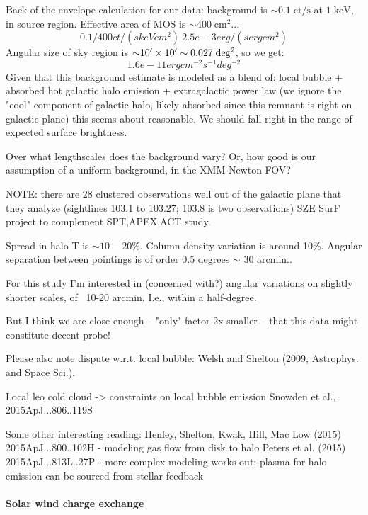 \documentclass[twocolumn,tighten,trackchanges]{aastex6}
\newcommand*{\mt}{\mathrm}
\newcommand*{\unit}[1]{\;\mt{#1}}  %
\newcommand*{\abt}{\mathord{\sim}} %
\begin{document}
Back of the envelope calculation for our data:
background is $\abt0.1 \unit{ct/s}$ at $1 \unit{keV}$, in source region.
Effective area of MOS is $\abt400 \unit{cm^2}$...
\[
    0.1/400 ct/(s keV cm^2) ~ 2.5e-3 erg / (s erg cm^2)
\]
Angular size of sky region is $\abt 10\arcmin \times 10\arcmin \sim 0.027 \unit{deg^2}$, so we get:
\[
    1.6e-11 erg cm^{-2} s^{-1} deg^{-2}
\]
Given that this background estimate is modeled as a blend of:
local bubble + absorbed hot galactic halo emission + extragalactic power law
(we ignore the "cool" component of galactic halo, likely absorbed since
this remnant is right on galactic plane)
this seems about reasonable.  We should fall right in the range of expected
surface brightness.


Over what lengthscales does the background vary?  Or, how good is our
assumption of a uniform background, in the XMM-Newton FOV?

NOTE: there are 28 clustered observations well out of the galactic plane
that they analyze (sightlines 103.1 to 103.27; 103.8 is two observations)
SZE SurF project to complement SPT,APEX,ACT study.

    Spread in halo T is $\abt10-20\%$.  Column density variation is around 10\%.
    Angular separation between pointings is of order 0.5 degrees $\sim$ 30 arcmin..

    For this study I'm interested in (concerned with?)
    angular variations on slightly shorter scales, of ~10-20 arcmin.  I.e.,
    within a half-degree.

    But I think we are close enough -- "only" factor 2x smaller -- that this
    data might constitute decent probe!



Please also note dispute w.r.t. local bubble: Welsh and Shelton (2009,
Astrophys. and Space Sci.).

Local leo cold cloud -> constraints on local bubble emission
Snowden et al., 2015ApJ...806..119S

Some other interesting reading:
Henley, Shelton, Kwak, Hill, Mac Low (2015) 2015ApJ...800..102H
- modeling gas flow from disk to halo
Peters et al. (2015) 2015ApJ...813L..27P
- more complex modeling works out; plasma for halo emission can be sourced from
  stellar feedback

\paragraph{Solar wind charge exchange}
\end{document}
